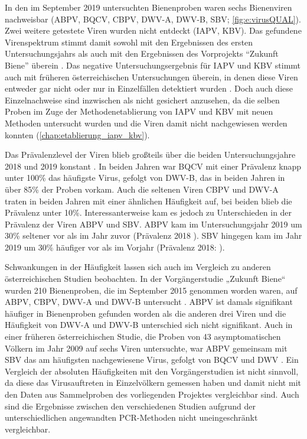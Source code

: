 In den im September 2019 untersuchten Bienenproben waren sechs Bienenviren nachweisbar (ABPV, BQCV, CBPV, DWV-A, DWV-B, SBV; \cref{fig:e:virusQUAL}). Zwei weitere getestete Viren wurden nicht entdeckt (IAPV, KBV). Das gefundene Virenspektrum stimmt damit sowohl mit den Ergebnissen des ersten Untersuchungsjahrs als auch mit den Ergebnissen des Vorprojekts \enquote{Zukunft Biene} überein \citep{brodschneider2018b,brodschneider2019b}. Das negative Untersuchungsergebnis für IAPV und KBV stimmt auch mit früheren österreichischen Untersuchungen überein, in denen diese Viren entweder gar nicht oder nur in Einzelfällen detektiert wurden \citep{köglberger2009,girsch2012,moosbeckhofer2014}. Doch auch diese Einzelnachweise sind inzwischen als nicht gesichert anzusehen, da die selben Proben im Zuge der Methodenetablierung von IAPV und KBV mit neuen Methoden untersucht wurden und die Viren damit nicht nachgewiesen werden konnten (\cref{chap:etablierung_iapv_kbv}).

Das Prävalenzlevel der Viren blieb großteils über die beiden Untersuchungsjahre 2018 und 2019 konstant \citep{brodschneider2019b,morawetz2019a}. In beiden Jahren war BQCV mit einer Prävalenz knapp unter 100\% das häufigste Virus, gefolgt von DWV-B, das in beiden Jahren in über 85\% der Proben vorkam. Auch die seltenen Viren CBPV und DWV-A traten in beiden Jahren mit einer ähnlichen Häufigkeit auf, bei beiden blieb die Prävalenz unter 10\%. Interessanterweise kam es jedoch zu Unterschieden in der Prävalenz der Viren ABPV und SBV. ABPV kam im Untersuchungsjahr 2019 um 30\% seltener vor als im Jahr zuvor (Prävalenz 2018 ). SBV hingegen kam im Jahr 2019 um 30\% häufiger vor als im Vorjahr (Prävalenz 2018: ).

Schwankungen in der Häufigkeit lassen sich auch im Vergleich zu anderen österreichischen Studien beobachten. In der Vorgängerstudie „Zukunft Biene“ wurden 210 Bienenproben, die im September 2015 genommen worden waren, auf ABPV, CBPV, DWV-A und DWV-B untersucht \citep{morawetz2018}. ABPV ist damals signifikant häufiger in Bienenproben gefunden worden als die anderen drei Viren und die Häufigkeit von DWV-A und DWV-B unterschied sich nicht signifikant. Auch in einer früheren österreichischen Studie, die Proben von 43 asymptomatischen Völkern im Jahr 2009 auf sechs Viren untersuchte, war ABPV gemeinsam mit SBV das am häufigsten nachgewiesene Virus, gefolgt von BQCV und DWV \citep{köglberger2009}. Ein Vergleich der absoluten Häufigkeiten mit den Vorgängerstudien ist nicht sinnvoll, da diese das Virusauftreten in Einzelvölkern gemessen haben und damit nicht mit den Daten aus Sammelproben des vorliegenden Projektes vergleichbar sind. Auch sind die Ergebnisse zwischen den verschiedenen Studien aufgrund der unterschiedlichen angewandten PCR-Methoden nicht uneingeschränkt vergleichbar.


